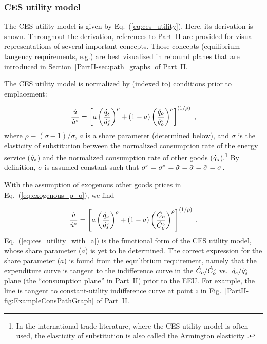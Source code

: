\documentclass[12pt]{article}\usepackage[]{graphicx}\usepackage[]{xcolor}
\begin{document}
\subsubsection{CES utility model}
\label{sec:derivation_ces_utility}

The CES utility model is given by Eq.~(\ref{eq:ces_utility}).
Here, its derivation is shown.
Throughout the derivation, 
references to Part~II are provided
for visual representations  
of several important concepts. 
Those concepts (equilibrium tangency requirements, e.g.)
are best visualized in rebound planes that are 
introduced in Section~\ref{PartII-sec:path_graphs} of Part~II.

The CES utility model
is normalized by (indexed to) conditions prior to emplacement:

\begin{equation}
  \frac{\dot{u}}{{}{\dot{u}}^{\scriptscriptstyle \circ}} = 
  \left[ a \left( \frac{\dot{q}_s}{{}{\dot{q}}^{\scriptscriptstyle \circ}_s} \right)^\rho 
        + (1-a) \left( \frac{\dot{q}_o}{{}{\dot{q}}^{\scriptscriptstyle \circ}_o} \right)^\rho  \right]^{(1/\rho)} \; ,
\end{equation}
%
where $\rho \equiv (\sigma - 1)/\sigma$,
$a$ is a share parameter (determined below), and 
$\sigma$ is the elasticity of substitution between
the normalized consumption rate of the energy service ($\dot{q}_s$) and 
the normalized consumption rate of other goods ($\dot{q}_o$).\footnote{In the
international trade literature, where the CES utility model is
often used, the elasticity of substitution is also called the Armington elasticity \citep{Feenstra2018}.}
By definition, $\sigma$ is assumed constant such that
${}{\sigma}^{\scriptscriptstyle \circ} = {\sigma}^* = \hat{\sigma} = \bar{\sigma} = \tilde{\sigma} = \sigma$.

With the assumption of exogenous other goods prices 
in Eq.~(\ref{eq:exogenous_p_o}), 
we find

\begin{equation} \label{eq:ces_utility_with_a}
  \frac{\dot{u}}{{}{\dot{u}}^{\scriptscriptstyle \circ}} = 
  \left[ a \left( \frac{\dot{q}_s}{{}{\dot{q}}^{\scriptscriptstyle \circ}_s} \right)^\rho 
        + (1-a) \left( \frac{\dot{C}_o}{{}{\dot{C}}^{\scriptscriptstyle \circ}_o} \right)^\rho  \right]^{(1/\rho)} \; .
\end{equation}
%
Eq.~(\ref{eq:ces_utility_with_a}) is the functional form of the CES utility model,
whose share parameter ($a$) is yet to be determined.
The correct expression for the share parameter ($a$) is found from the 
equilibrium requirement,
namely that the expenditure curve 
is tangent to the indifference curve
in the $\dot{C}_o/{}{\dot{C}}^{\scriptscriptstyle \circ}_o$ vs.\ $\dot{q}_s/{}{\dot{q}}^{\scriptscriptstyle \circ}_s$ plane
(the ``consumption plane'' in Part~II)
prior to the EEU.
For example, the \circcirc{} line is tangent to constant-utility 
indifference curve \iicirc{} at point $\circ$
in Fig.~\ref{PartII-fig:ExampleConsPathGraph} of Part~II.
\end{document}
